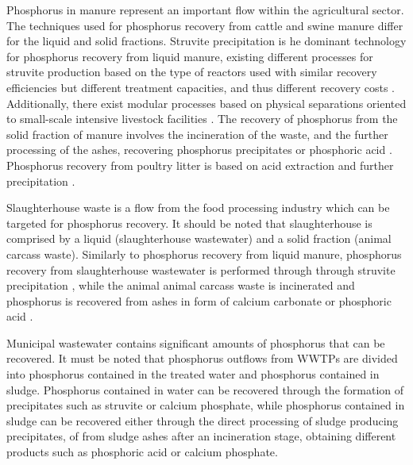 \documentclass[authoryear]{elsarticle}
\begin{document}
Phosphorus in manure represent an important flow within the agricultural sector.
The techniques used for phosphorus recovery from cattle and swine manure differ for the liquid and solid fractions. Struvite precipitation is he dominant technology for phosphorus recovery from liquid manure, existing different processes for struvite production based on the type of reactors used with similar recovery efficiencies but different treatment capacities, and thus different recovery costs \citep{martin2021geospatial}. Additionally, there exist modular processes based on physical separations oriented to small-scale intensive livestock facilities \citep{church_versatility_2018}. The recovery of phosphorus from the solid fraction of manure involves the incineration of the waste, and the further processing of the ashes, recovering phosphorus precipitates or phosphoric acid \citep{jupp2021phosphorus,egle_phosphorus_2016}. Phosphorus recovery from poultry litter is based on acid extraction and further precipitation \citep{szogi2008phosphorus}.

Slaughterhouse waste is a flow from the food processing industry which can be targeted for phosphorus recovery. It should be noted that slaughterhouse is comprised by a liquid (slaughterhouse wastewater) and a solid fraction (animal carcass waste).
Similarly to phosphorus recovery from liquid manure, phosphorus recovery from slaughterhouse wastewater is performed through through struvite precipitation \citep{Pearl2Kcost2}, while the animal animal carcass waste is incinerated and phosphorus is recovered from ashes in form of calcium carbonate or phosphoric acid \citep{jupp2021phosphorus}.

Municipal wastewater contains significant amounts of phosphorus that can be recovered. It must be noted that phosphorus outflows from WWTPs are divided into phosphorus contained in the treated water and phosphorus contained in sludge. Phosphorus contained in water can be recovered through the formation of precipitates such as struvite or calcium phosphate, while phosphorus contained in sludge can be recovered either through the direct processing of sludge producing precipitates, of from sludge ashes after an incineration stage, obtaining different products such as phosphoric acid or calcium phosphate.
\end{document}

